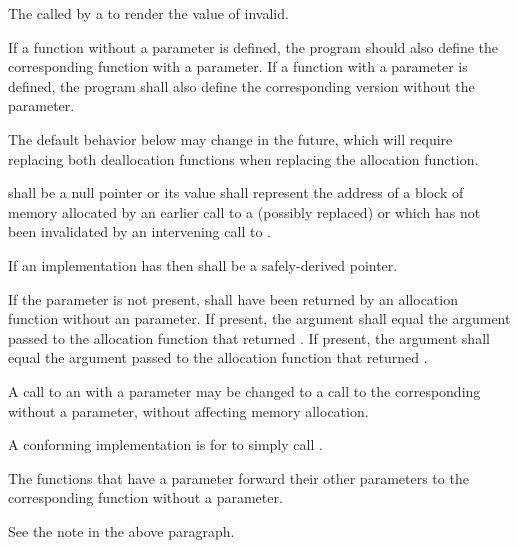 \begin{itemdescr}
\pnum
\effects
The
called by a
to render the value of  invalid.

\pnum
\replaceable
{}
If a function without a  parameter is defined,
the program should also define
the corresponding function with a  parameter.
If a function with a  parameter is defined,
the program shall also define
the corresponding version without the  parameter.
\begin{note}
The default behavior below may change in the future, which will require
replacing both deallocation functions when replacing the allocation function.
\end{note}

\pnum
\requires
{} shall be a null pointer or
its value shall represent the address of
a block of memory allocated by
an earlier call to a (possibly replaced)
or
which has not been invalidated by an intervening call to
.

\pnum
\requires
If an implementation has 
then  shall be a safely-derived pointer.

\pnum
\requires
If the  parameter is not present,
 shall have been returned by an allocation function
without an  parameter.
If present, the  argument
shall equal the  argument
passed to the allocation function that returned .
If present, the  argument
shall equal the  argument
passed to the allocation function that returned .

\pnum
\required
A call to an 
with a  parameter
may be changed to
a call to the corresponding 
without a  parameter,
without affecting memory allocation.
\begin{note} A conforming implementation is for
 to simply call
. \end{note}

\pnum
{}
The functions that have a  parameter
forward their other parameters
to the corresponding function without a  parameter.
\begin{note} See the note in the above \replaceable paragraph. \end{note}


\end{itemdescr}
